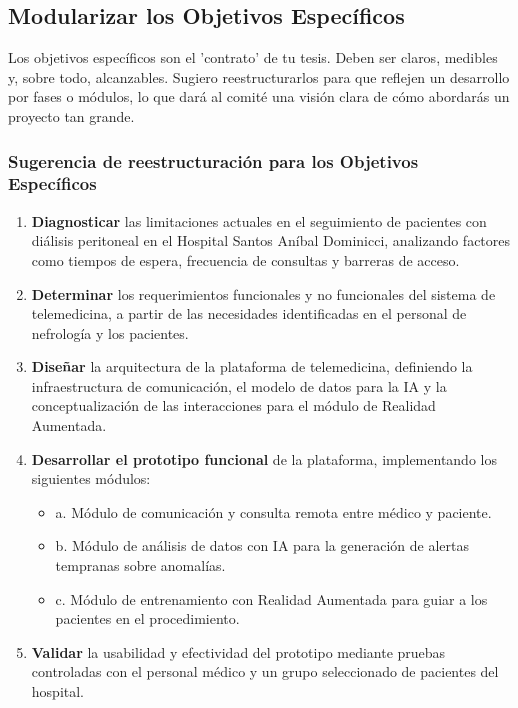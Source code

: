 \documentclass{article}
\begin{document}
\subsection{Modularizar los Objetivos Específicos}

Los objetivos específicos son el 'contrato' de tu tesis. Deben ser claros, medibles y, sobre todo, alcanzables. Sugiero reestructurarlos para que reflejen un desarrollo por fases o módulos, lo que dará al comité una visión clara de cómo abordarás un proyecto tan grande.

\subsubsection{Sugerencia de reestructuración para los Objetivos Específicos}
\begin{enumerate}
    \item \textbf{Diagnosticar} las limitaciones actuales en el seguimiento de pacientes con diálisis peritoneal en el Hospital Santos Aníbal Dominicci, analizando factores como tiempos de espera, frecuencia de consultas y barreras de acceso.
    \item \textbf{Determinar} los requerimientos funcionales y no funcionales del sistema de telemedicina, a partir de las necesidades identificadas en el personal de nefrología y los pacientes.
    \item \textbf{Diseñar} la arquitectura de la plataforma de telemedicina, definiendo la infraestructura de comunicación, el modelo de datos para la IA y la conceptualización de las interacciones para el módulo de Realidad Aumentada.
    \item \textbf{Desarrollar el prototipo funcional} de la plataforma, implementando los siguientes módulos:
    \begin{itemize}
        \item a. Módulo de comunicación y consulta remota entre médico y paciente.
        \item b. Módulo de análisis de datos con IA para la generación de alertas tempranas sobre anomalías.
        \item c. Módulo de entrenamiento con Realidad Aumentada para guiar a los pacientes en el procedimiento.
    \end{itemize}
    \item \textbf{Validar} la usabilidad y efectividad del prototipo mediante pruebas controladas con el personal médico y un grupo seleccionado de pacientes del hospital.
\end{enumerate}
\end{document}
